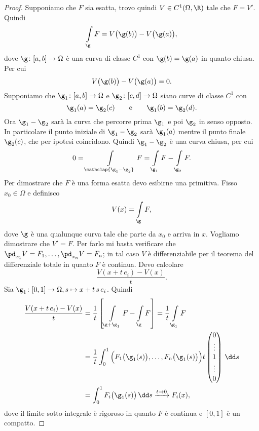 \begin{proof}
	Supponiamo che \(F\) sia esatta, trovo quindi \(V\in C^1(\Omega,\R)\) tale che \(F=V'\).
	Quindi
	\[
		\int\limits_\g F = V\big(\g(b)\big) - V\big(\g(a)\big),
	\]
	dove \(\g\colon [a,b]\to \Omega\) è una curva di classe \(C^1\) con \(\g(b)=\g(a)\) in quanto chiusa.
	Per cui
	\[
		V\big(\g(b)\big) - V\big(\g(a)\big) = 0.
	\]
	Supponiamo che \(\g_1\colon [a,b] \to \Omega\) e \(\g_2\colon [c,d] \to \Omega\) siano curve di classe \(C^1\) con
	\[
		\g_1(a) = \g_2(c) \qquad\text{e}\qquad \g_1(b) = \g_2(d).
	\]
	Ora \(\g_1-\g_2\) sarà la curva che percorre prima \(\g_1\) e poi \(\g_2\) in senso opposto.
	In particolare il punto iniziale di \(\g_1-\g_2\) sarà \(\g_1(a)\) mentre il punto finale \(\g_2(c)\), che per ipotesi coincidono.
	Quindi \(\g_1-\g_2\) è una curva chiusa, per cui
	\[
		0 = \int\limits_{\mathclap{\g_1-\g_2}} F = \int\limits_{\g_1} F - \int\limits_{\g_2} F.
	\]
	Per dimostrare che \(F\) è una forma esatta devo esibirne una primitiva.
	Fisso \(x_0\in\Omega\) e definisco
	\[
		V(x) = \int\limits_\g F,
	\]
	dove \(\g\) è una qualunque curva tale che parte da \(x_0\) e arriva in \(x\).
	Vogliamo dimostrare che \(V'=F\).
	Per farlo mi basta verificare che \(\pd_{x_1}V = F_1, \ldots, \pd_{x_n}V = F_n\); in tal caso \(V\) è differenziabile per il teorema del differenziale totale in quanto \(F\) è continua.
	Devo calcolare
	\[
		\frac{V(x+t\,e_i)-V(x)}{t}.
	\]
	Sia \(\g_1\colon [0,1] \to \Omega, s\mapsto x+t\,s\,e_i\).
	Quindi
	\[
		\begin{split}
			\frac{V(x+t\,e_i)-V(x)}{t} & = \frac{1}{t}\left[ \int\limits_{\g+\g_1}F-\int\limits_\g F \right] = \frac{1}{t}\int\limits_{\g_1} F\\
			& = \frac{1}{t} \int_0^1 \Big(F_1\big(\g_1(s)\big),\ldots,F_n\big(\g_1(s)\big)\Big) t \begin{pmatrix}0\\\vdots\\1\\\vdots\\0\end{pmatrix}\,\dd s\\
			& = \int_0^1 F_i\big(\g_1(s)\big)\,\dd s \xrightarrow{t\to 0} F_i(x),
		\end{split}
	\]
	dove il limite sotto integrale è rigoroso in quanto \(F\) è continua e \([0,1]\) è un compatto.
\end{proof}

